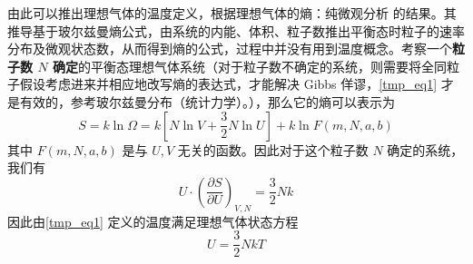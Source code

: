 由此可以推出理想气体的温度定义，根据理想气体的熵：纯微观分析 的结果。其推导基于玻尔兹曼熵公式，由系统的内能、体积、粒子数推出平衡态时粒子的速率分布及微观状态数，从而得到熵的公式，过程中并没有用到温度概念。考察一个\textbf{粒子数 $N$ 确定}的平衡态理想气体系统（对于粒子数不确定的系统，则需要将全同粒子假设考虑进来并相应地改写熵的表达式，才能解决 Gibbs 佯谬，\autoref{tmp_eq1} 才是有效的，参考玻尔兹曼分布（统计力学）。），那么它的熵可以表示为
\begin{equation}
S=k\ln \Omega =k\left[ N\ln V+\frac{3}{2}N\ln U \right] +k\ln F\left( m,N,a,b \right) 
\end{equation}
其中 $F(m,N,a,b)$ 是与 $U,V$ 无关的函数。因此对于这个粒子数 $N$ 确定的系统，我们有
\begin{equation}
U\cdot \left(\frac{\partial S}{\partial U}\right)_{V,N}=\frac{3}{2}Nk
\end{equation}
因此由\autoref{tmp_eq1} 定义的温度满足理想气体状态方程
\begin{equation}
U=\frac{3}{2}NkT
\end{equation}
